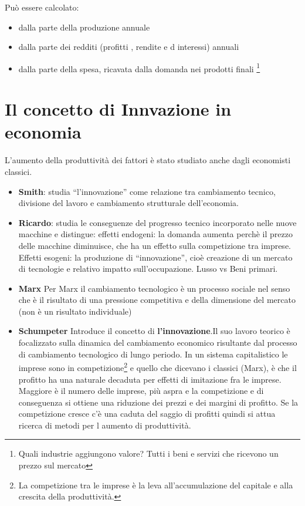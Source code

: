 \documentclass{article}
\begin{document}
Può essere calcolato:
\begin{itemize}
    \item dalla parte della produzione annuale
    \item dalla parte dei redditi (profitti , rendite e d interessi) annuali
    \item dalla parte della spesa, ricavata dalla domanda nei prodotti finali \footnote{Quali industrie aggiungono valore? Tutti i beni e servizi
che ricevono un prezzo sul mercato }

\end{itemize}


\section{Il concetto di Innvazione in economia}
L’aumento della produttività dei fattori è stato studiato anche dagli economisti
classici. 
\begin{itemize}
    \item \textbf{Smith}: studia “l’innovazione” come relazione tra
cambiamento tecnico, divisione del lavoro e cambiamento strutturale
dell’economia.
\item \textbf{Ricardo}: studia le conseguenze del progresso tecnico
incorporato nelle nuove macchine e distingue: effetti endogeni: la domanda aumenta perchè il prezzo delle macchine diminuisce, che ha un effetto sulla competizione tra imprese.
Effetti esogeni: la produzione di “innovazione”, cioè creazione di un
mercato di tecnologie e relativo impatto sull’occupazione. Lusso vs Beni primari.
\item \textbf{Marx} Per Marx il cambiamento tecnologico è un processo sociale nel senso che è il
risultato di una pressione competitiva e della dimensione del mercato (non è un risultato individuale)
\item \textbf{Schumpeter} Introduce il concetto di  \textbf{l'innovazione}.Il suo lavoro teorico è focalizzato sulla dinamica del cambiamento
 economico risultante dal processo di cambiamento tecnologico
di lungo periodo.
In un sistema capitalistico le imprese sono in competizione\footnote{La competizione tra le imprese è la leva all’accumulazione del capitale e alla crescita
della produttività. } e quello che dicevano i classici (Marx), è che il profitto ha una naturale decaduta per effetti di imitazione fra le imprese. Maggiore è il numero delle imprese, più aspra e la competizione e di conseguenza si ottiene una  riduzione dei prezzi e dei margini di profitto. Se la competizione cresce c'è una  caduta del saggio di profitti quindi  si attua ricerca di metodi per l aumento di produttività.
\end{itemize}
\end{document}
